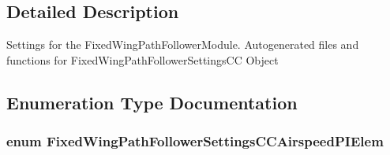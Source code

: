 \subsection{\-Detailed \-Description}
\-Settings for the \-Fixed\-Wing\-Path\-Follower\-Module. \-Autogenerated files and functions for \-Fixed\-Wing\-Path\-Follower\-Settings\-C\-C \-Object 

\subsection{\-Enumeration \-Type \-Documentation}
\hypertarget{group___fixed_wing_path_follower_settings_c_c_ga831d948329ddf34d549a3c41f37c79ed}{
\subsubsection[{\-Fixed\-Wing\-Path\-Follower\-Settings\-C\-C\-Airspeed\-P\-I\-Elem}]{\setlength{\rightskip}{0pt plus 5cm}enum {\bf \-Fixed\-Wing\-Path\-Follower\-Settings\-C\-C\-Airspeed\-P\-I\-Elem}}}\label{group___fixed_wing_path_follower_settings_c_c_ga831d948329ddf34d549a3c41f37c79ed}

